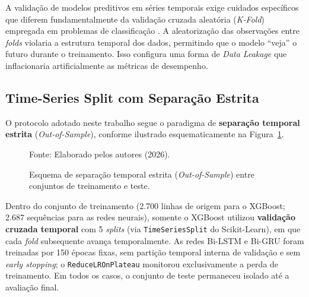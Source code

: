 A validação de modelos preditivos em séries temporais exige cuidados específicos que diferem fundamentalmente da validação cruzada aleatória (\textit{K-Fold}) empregada em problemas de classificação \cite{hastie2009elements}. A aleatorização das observações entre \textit{folds} violaria a estrutura temporal dos dados, permitindo que o modelo ``veja'' o futuro durante o treinamento. Isso configura uma forma de \textit{Data Leakage} que inflacionaria artificialmente as métricas de desempenho.

\subsection{Time-Series Split com Separação Estrita}

O protocolo adotado neste trabalho segue o paradigma de \textbf{separação temporal estrita} (\textit{Out-of-Sample}), conforme ilustrado esquematicamente na Figura~\ref{fig:time_split}.

\begin{figure}[H]
\centering
{}
\caption{Esquema de separação temporal estrita (\textit{Out-of-Sample}) entre conjuntos de treinamento e teste.}
\small{Fonte: Elaborado pelos autores (2026).}
\label{fig:time_split}
\end{figure}

Dentro do conjunto de treinamento (2.700 linhas de origem para o XGBoost; 2.687 sequências para as redes neurais), somente o XGBoost utilizou \textbf{validação cruzada temporal} com 5 \textit{splits} (via \texttt{TimeSeriesSplit} do Scikit-Learn), em que cada \textit{fold} subsequente avança temporalmente. As redes Bi-LSTM e Bi-GRU foram treinadas por 150 épocas fixas, sem partição temporal interna de validação e sem \textit{early stopping}; o \texttt{ReduceLROnPlateau} monitorou exclusivamente a perda de treinamento. Em todos os casos, o conjunto de teste permaneceu isolado até a avaliação final.

